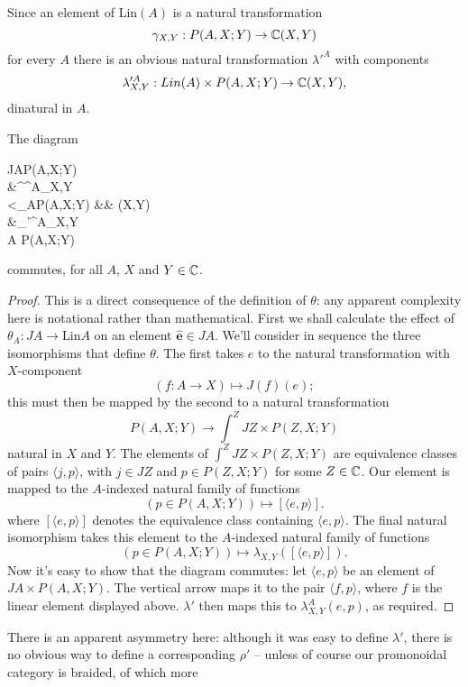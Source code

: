 \documentclass{robinminion}
\newcommand\Lin{\mathrm{Lin}}
\renewcommand\e{\hat{\mathbf{e}}}
\begin{document}
Since an element of $\Lin(A)$ is a natural transformation 
\[
	\gamma_{X,Y}: P(A,X;Y) \to \mathbb{C}(X,Y)
\]
for every $A$ there is an obvious natural transformation $\lambda'^A$
with components
\[
	\lambda'^A_{X,Y}: Lin(A)\times P(A,X;Y) \to \mathbb{C}(X,Y),
\]
dinatural in $A$.

\begin{propn}
	The diagram
	\begin{diagram}[h=2em]
		JA\times P(A,X;Y) \\
		&\rdTo^{\lambda^A_{X,Y}}\\
		\dTo<{\theta_A\times P(A,X;Y)} && \C(X,Y) \\
		&\ruTo_{\lambda'^A_{X,Y}} \\
		\Lin A \times P(A,X;Y)
	\end{diagram}
	commutes, for all $A$, $X$ and $Y\in\mathbb{C}$.
\end{propn}
\begin{proof}
	This is a direct consequence of the definition of $\theta$: any
	apparent complexity here is notational rather than mathematical.
	First we shall calculate the effect of $\theta_A: JA\to\Lin A$
	on an element $\e\in JA$. We'll consider in sequence the three
	isomorphisms that define $\theta$. The first takes $e$ to the
	natural transformation with $X$-component
	\[
		(f:A\to X) \mapsto J(f)(e);
	\]
	this must then be mapped by the second to a natural transformation
	\[
		P(A,X;Y) \to \int^Z JZ\times P(Z,X;Y)
	\]
	natural in $X$ and $Y$.
	The elements of $\int^Z JZ\times P(Z,X;Y)$ are equivalence classes
	of pairs $\langle j, p\rangle$, with $j\in JZ$ and $p\in P(Z,X;Y)$
	for some $Z\in\mathbb{C}$. Our element is mapped to the $A$-indexed natural
	family of functions
	\[
		(p\in P(A,X;Y)) \mapsto [\langle e,p\rangle].
	\]
	where $[\langle e,p\rangle]$ denotes the equivalence class containing
	$\langle e,p\rangle$. The final natural isomorphism takes this element
	to the $A$-indexed natural family of functions
	\[
		(p\in P(A,X;Y)) \mapsto \lambda_{X,Y}([\langle e,p\rangle]).
	\]
	Now it's easy to show that the diagram commutes: let $\langle e,p\rangle$
	be an element of $JA\times P(A,X;Y)$. The vertical arrow maps it to
	the pair $\langle f, p\rangle$, where $f$ is the linear element
	displayed above. $\lambda'$ then maps this to $\lambda_{X,Y}^A(e,p)$,
	as required.
\end{proof}
%
There is an apparent asymmetry here: although it was easy to define
$\lambda'$, there is no obvious way to define a corresponding $\rho'$
-- unless of course our promonoidal category is braided, of which more
\end{document}

